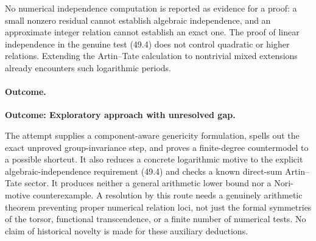 \documentclass[11pt,a4paper]{article}
\numberwithin{equation}{section}
\begin{document}
No numerical independence computation is reported as evidence for a
proof: a small nonzero residual cannot establish algebraic independence,
and an approximate integer relation cannot establish an exact one. The
proof of linear independence in the genuine test (49.4) does not control
quadratic or higher relations. Extending the Artin--Tate calculation to
nontrivial mixed extensions already encounters such logarithmic periods.

\paragraph{Outcome.}
\textbf{Outcome: Exploratory approach with unresolved gap.}

The attempt supplies a component-aware genericity formulation, spells out
the exact unproved group-invariance step, and proves a finite-degree
countermodel to a possible shortcut. It also reduces a concrete logarithmic
motive to the explicit algebraic-independence requirement (49.4) and checks
a known direct-sum Artin--Tate sector. It produces neither a general
arithmetic lower bound nor a Nori-motive counterexample. A resolution by
this route needs a genuinely arithmetic theorem preventing proper
numerical relation loci, not just the formal symmetries of the torsor,
functional transcendence, or a finite number of numerical tests. No claim
of historical novelty is made for these auxiliary deductions.
\end{document}
